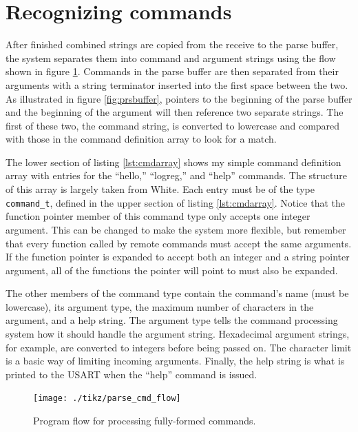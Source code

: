 \clearpage{}
\section{Recognizing commands}
After finished combined strings are copied from the receive to the parse buffer, the system separates them into command and argument strings using the flow shown in figure \ref{fig:cmdflow}.  Commands in the parse buffer are then separated from their arguments with a string terminator inserted into the first space between the two.  As illustrated in figure \ref{fig:prsbuffer}, pointers to the beginning of the parse buffer and the beginning of the argument will then reference two separate strings.  The first of these two, the command string, is converted to lowercase and compared with those in the command definition array to look for a match.

The lower section of listing \ref{lst:cmdarray} shows my simple command definition array with entries for the ``hello,'' ``logreg,'' and ``help'' commands. The structure of this array is largely taken from White\cite{bok:white2012}.  Each entry must be of the type \texttt{command\_t}, defined in the upper section of listing \ref{lst:cmdarray}.  Notice that the function pointer member of this command type only accepts one integer argument.  This can be changed to make the system more flexible, but remember that every function called by remote commands must accept the same arguments.  If the function pointer is expanded to accept both an integer and a string pointer argument, all of the functions the pointer will point to must also be expanded.  

The other members of the command type contain the command's name (must be lowercase), its argument type, the maximum number of characters in the argument, and a help string.  The argument type tells the command processing system how it should handle the argument string.  Hexadecimal argument strings, for example, are converted to integers before being passed on.  The character limit is a basic way of limiting incoming arguments.  Finally, the help string is what is printed to the USART when the ``help'' command is issued.


\begin{figure}[ht]
    \begin{center}
        \texttt{[image: ./tikz/parse\_cmd\_flow]}
        \caption{Program flow for processing fully-formed commands.\label{fig:cmdflow}}
    \end{center}
\end{figure}

